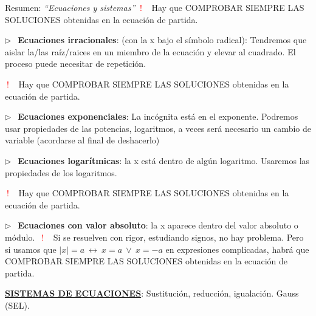 \begin{small}
\begin{myblock}{Resumen: \emph{``Ecuaciones y sistemas''}}
\vspace{2mm} \textcolor{red}{$\boldsymbol{\boxed{ \ ! \ }} $}  $\ $ Hay que COMPROBAR SIEMPRE LAS SOLUCIONES obtenidas en la ecuación de partida.

\vspace{4mm} $\triangleright \ \ $ \textbf{Ecuaciones irracionales}: (con la x bajo el símbolo radical): Tendremos que aislar la/las raíz/raices en un miembro de la ecuación y elevar al cuadrado. El proceso puede necesitar de repetición.

\vspace{2mm} \textcolor{red}{$\boldsymbol{\boxed{ \ ! \ }} $}  $\ $ Hay que COMPROBAR SIEMPRE LAS SOLUCIONES obtenidas en la ecuación de partida.

\vspace{4mm} $\triangleright \ \ $ \textbf{Ecuaciones exponenciales}: La incógnita está en el exponente. Podremos usar propiedades de las potencias, logaritmos, a veces será necesario un cambio de variable (acordarse al final de deshacerlo)

\vspace{4mm} $\triangleright \ \ $ \textbf{Ecuaciones logarítmicas}: la x está dentro de algún logaritmo. Usaremos las propiedades de los logaritmos.

\vspace{2mm} \textcolor{red}{$\boldsymbol{\boxed{ \ ! \ }} $}  $\ $ Hay que COMPROBAR SIEMPRE LAS SOLUCIONES obtenidas en la ecuación de partida.

\vspace{4mm} $\triangleright \ \ $ \textbf{Ecuaciones con valor absoluto}: la x aparece dentro del valor absoluto o módulo.$\ $ \textcolor{red}{$\boldsymbol{\boxed{ \ ! \ }} $}  $\ $ Si se resuelven con rigor, estudiando signos, no hay problema. Pero si usamos que $|x|=a\ \leftrightarrow \  x=a  \ \vee \   x=-a$ en expresiones complicadas, habrá que COMPROBAR SIEMPRE LAS SOLUCIONES obtenidas en la ecuación de partida.


\vspace{6mm} \textbf{\underline{SISTEMAS DE ECUACIONES}}:  Sustitución, reducción, igualación. Gauss (SEL).
	
\end{myblock}
\end{small}







